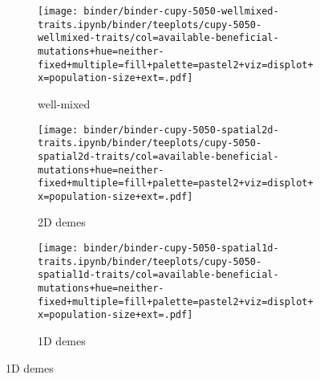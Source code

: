 \begin{figure}[h]

\begin{subfigure}[b]{\linewidth}
    \begin{minipage}{\textwidth}
      \centering
      \texttt{[image: binder/binder-cupy-5050-wellmixed-traits.ipynb/binder/teeplots/cupy-5050-wellmixed-traits/col=available-beneficial-mutations+hue=neither-fixed+multiple=fill+palette=pastel2+viz=displot+x=population-size+ext=.pdf]}%
    \end{minipage}
    \begin{minipage}{\textwidth}
    \caption{well-mixed}
    \label{fig:neither-fixed-5050-cupy:wellmixed}
    \end{minipage}%
\end{subfigure}%

    \begin{subfigure}[b]{\linewidth}
        \begin{minipage}{\textwidth}
          \centering
          \texttt{[image: binder/binder-cupy-5050-spatial2d-traits.ipynb/binder/teeplots/cupy-5050-spatial2d-traits/col=available-beneficial-mutations+hue=neither-fixed+multiple=fill+palette=pastel2+viz=displot+x=population-size+ext=.pdf]}%
        \end{minipage}
        \begin{minipage}{\textwidth}
        \caption{2D demes}
        \label{fig:neither-fixed-5050-cupy:spatial2d}
        \end{minipage}%
    \end{subfigure}%

    \begin{subfigure}[b]{\linewidth}
        \begin{minipage}{\textwidth}
        \centering
        \texttt{[image: binder/binder-cupy-5050-spatial1d-traits.ipynb/binder/teeplots/cupy-5050-spatial1d-traits/col=available-beneficial-mutations+hue=neither-fixed+multiple=fill+palette=pastel2+viz=displot+x=population-size+ext=.pdf]}%
        \end{minipage}
        \begin{minipage}{\textwidth}
        \caption{1D demes}
        \label{fig:neither-fixed-5050-cupy:spatial1d}
        \end{minipage}%
    \end{subfigure}


\end{figure}
